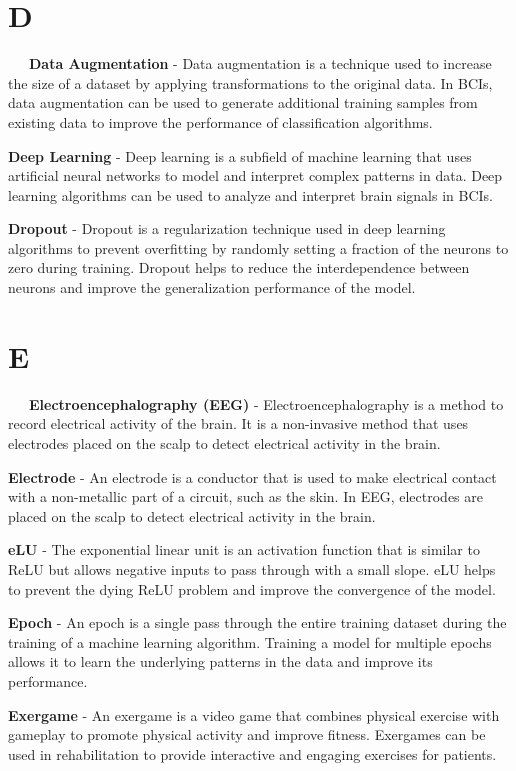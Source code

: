\section*{D}

\-\ \-\ \-\ \textbf{Data Augmentation} - Data augmentation is a technique used to increase the size of a dataset by applying transformations to the original data. In BCIs, data augmentation can be used to generate additional training samples from existing data to improve the performance of classification algorithms.

\textbf{Deep Learning} - Deep learning is a subfield of machine learning that uses artificial neural networks to model and interpret complex patterns in data. Deep learning algorithms can be used to analyze and interpret brain signals in BCIs.

\textbf{Dropout} - Dropout is a regularization technique used in deep learning algorithms to prevent overfitting by randomly setting a fraction of the neurons to zero during training. Dropout helps to reduce the interdependence between neurons and improve the generalization performance of the model.

\section*{E}

\-\ \-\ \-\ \textbf{Electroencephalography (EEG)} - Electroencephalography is a method to record electrical activity of the brain. It is a non-invasive method that uses electrodes placed on the scalp to detect electrical activity in the brain.

\textbf{Electrode} - An electrode is a conductor that is used to make electrical contact with a non-metallic part of a circuit, such as the skin. In EEG, electrodes are placed on the scalp to detect electrical activity in the brain.

\textbf{eLU} - The exponential linear unit is an activation function that is similar to ReLU but allows negative inputs to pass through with a small slope. eLU helps to prevent the dying ReLU problem and improve the convergence of the model.

\textbf{Epoch} - An epoch is a single pass through the entire training dataset during the training of a machine learning algorithm. Training a model for multiple epochs allows it to learn the underlying patterns in the data and improve its performance.

\textbf{Exergame} - An exergame is a video game that combines physical exercise with gameplay to promote physical activity and improve fitness. Exergames can be used in rehabilitation to provide interactive and engaging exercises for patients.

